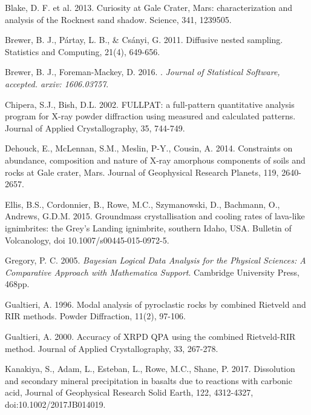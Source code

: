 \documentclass[review]{elsarticle}
\begin{document}
\begin{thebibliography}{99}
Blake, D. F. et al. 2013. Curiosity at Gale Crater, Mars: characterization and analysis of the Rocknest sand shadow. Science, 341, 1239505.

Brewer, B. J., Pártay, L. B., \& Csányi, G. 2011. Diffusive nested sampling. Statistics and Computing, 21(4), 649-656.

Brewer, B. J., Foreman-Mackey, D. 2016.
.
\newblock \emph{Journal of Statistical Software, accepted. arxiv: 1606.03757}.

Chipera, S.J., Bish, D.L. 2002. FULLPAT: a full-pattern quantitative analysis program for X-ray powder diffraction using measured and calculated patterns. Journal of Applied Crystallography, 35, 744-749.

Dehouck, E., McLennan, S.M., Meslin, P-Y., Cousin, A. 2014. Constraints on abundance, composition and nature of X-ray amorphous components of soils and rocks at Gale crater, Mars. Journal of Geophysical Research Planets, 119, 2640-2657.

Ellis, B.S., Cordonnier, B., Rowe, M.C., Szymanowski, D., Bachmann, O., Andrews, G.D.M. 2015. Groundmass crystallisation and cooling rates of lava-like ignimbrites: the Grey’s Landing ignimbrite, southern Idaho, USA. Bulletin of Volcanology, doi 10.1007/s00445-015-0972-5.

Gregory, P. C. 2005.
\newblock \emph{Bayesian Logical Data Analysis for the Physical Sciences: A
  Comparative Approach with Mathematica{\textregistered} Support}.
\newblock Cambridge University Press, 468pp.

Gualtieri, A. 1996. Modal analysis of pyroclastic rocks by combined Rietveld and RIR methods. Powder Diffraction, 11(2), 97-106.

Gualtieri, A. 2000. Accuracy of XRPD QPA using the combined Rietveld-RIR method. Journal of Applied Crystallography, 33, 267-278.

Kanakiya, S., Adam, L., Esteban, L., Rowe, M.C., Shane, P. 2017. Dissolution and secondary mineral precipitation in basalts due to reactions with carbonic acid, Journal of Geophysical Research Solid Earth, 122, 4312-4327, doi:10.1002/2017JB014019.


\end{thebibliography}
\end{document}
